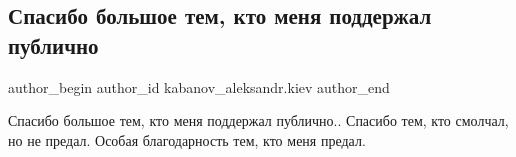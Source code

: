  
 
 
 
 
 
\subsection{Спасибо большое тем, кто меня поддержал публично}
\label{sec:14_12_2016.fb.kabanov_aleksandr.kiev.1.spasibo}
 
\ifcmt
 author_begin
   author_id kabanov_aleksandr.kiev
 author_end
\fi

Спасибо большое тем, кто меня поддержал публично.. Спасибо тем, кто смолчал, но
не предал. Особая благодарность тем, кто меня предал.


